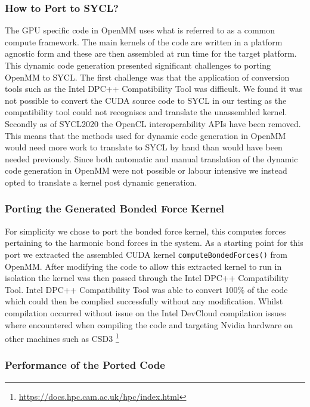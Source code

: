 \subsubsection{How to Port to SYCL?}\label{sec:openmm_howtoport}

The GPU specific code in OpenMM uses what is referred to as a common compute framework.
The main kernels of the code are written in a platform agnostic form and these are then assembled at run time for the target platform.
This dynamic code generation presented significant challenges to porting OpenMM to SYCL.
The first challenge was that the application of conversion tools such as the Intel DPC++ Compatibility Tool was difficult.
We found it was not possible to convert the CUDA source code to SYCL in our testing as the compatibility tool could not recognises and translate the unassembled kernel.
Secondly as of SYCL2020 the OpenCL interoperability APIs have been removed.
This means that the methods used for dynamic code generation in OpenMM would need more work to translate to SYCL by hand than would have been needed previously.
Since both automatic and manual translation of the dynamic code generation in OpenMM were not possible or labour intensive we instead opted to translate a kernel post dynamic generation.

\subsubsection{Porting the Generated Bonded Force Kernel}\label{sec:openmm_porting_genbf_kernel}

For simplicity we chose to port the bonded force kernel, this computes forces pertaining to the harmonic bond forces in the system.
As a starting point for this port we extracted the assembled CUDA kernel \verb!computeBondedForces()! from OpenMM.
After modifying the code to allow this extracted kernel to run in isolation the kernel was then passed through the Intel DPC++ Compatibility Tool.
Intel DPC++ Compatibility Tool was able to convert 100$\%$ of the code which could then be complied successfully without any modification.
Whilst compilation occurred without issue on the Intel DevCloud compilation issues where encountered when compiling the code and targeting Nvidia hardware on other machines such as CSD3 \footnote{\url{https://docs.hpc.cam.ac.uk/hpc/index.html}}

\subsubsection{Performance of the Ported Code}\label{sec:openmm_performance}

